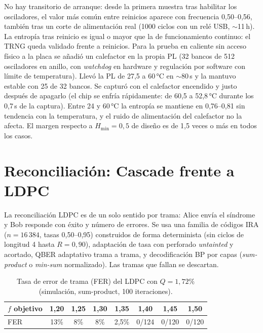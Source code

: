 \documentclass[a4paper,11pt]{article}
\begin{document}
\noindent
No hay transitorio de arranque: desde la primera muestra tras habilitar los osciladores, el valor más común
entre reinicios aparece con frecuencia 0,50--0,56, también tras un corte de alimentación real (1000 ciclos
con un relé USB, $\sim$11\,h). La entropía tras reinicio es igual o mayor que la de funcionamiento continuo:
el TRNG queda validado frente a reinicios. Para la prueba en caliente sin acceso físico a la placa se añadió un calefactor en la propia PL
(32 bancos de 512 osciladores en anillo, con \emph{watchdog} en hardware y regulación por software con
límite de temperatura). Llevó la PL de 27,5 a 60\,°C en $\sim$80\,s y la mantuvo estable con 25 de 32
bancos. Se capturó con el calefactor encendido y justo después de apagarlo (el chip se enfría
rápidamente: de 60,5 a 52,8\,°C durante los 0,7\,s de la captura). Entre 24 y 60\,°C la entropía se
mantiene en 0,76--0,81 sin tendencia con la temperatura, y el ruido de alimentación del calefactor no la
afecta. El margen respecto a $H_{\min}=0{,}5$ de diseño es de 1,5 veces o más en todos los casos.

\section{Reconciliación: Cascade frente a LDPC}
\label{sec:ldpc}

La reconciliación LDPC es de un solo sentido por trama: Alice envía el síndrome y Bob responde con éxito y
número de errores. Se usa una familia de códigos IRA ($n = 16\,384$, tasas 0,50--0,95) construidos de forma
determinista (sin ciclos de longitud 4 hasta $R = 0{,}90$), adaptación de tasa con perforado
\emph{untainted} y acortado, QBER adaptativo trama a trama, y decodificación BP por capas
(\emph{sum-product} o \emph{min-sum} normalizado). Las tramas que fallan se descartan.

\begin{table}[htbp]
\centering
\caption{Tasa de error de trama (FER) del LDPC con $Q = 1{,}72\%$ (simulación, sum-product, 100 iteraciones).}
\begin{tabular}{lccccccc}
\toprule
$f$ objetivo & 1,20 & 1,25 & 1,30 & 1,35 & 1,40 & 1,45 & 1,50 \\
\midrule
FER & 13\% & 8\% & 8\% & 2,5\% & 0/124 & 0/120 & 0/120 \\
\bottomrule
\end{tabular}
\end{table}
\end{document}
